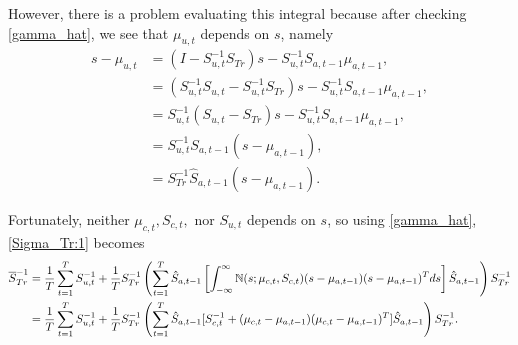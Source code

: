 \documentclass[12pt,leqno]{article}
\begin{document}
However, there is a problem evaluating this integral because after checking \eqref{gamma_hat}, we see that $\mu_{u,t}$
depends on $s$, namely  
\begin{equation}\label{s-mu_1}
  \begin{split}
    s-\mu_{u,t} &= (I - S_{u,t}^{-1}S_{Tr})s - S_{u,t}^{-1}S_{a,t-1}\mu_{a,t-1}, \\
    &= (S_{u,t}^{-1}S_{u,t} - S_{u,t}^{-1}S_{Tr})s - S_{u,t}^{-1}S_{a,t-1}\mu_{a,t-1}, \\
    &= S_{u,t}^{-1}(S_{u,t} - S_{Tr})s - S_{u,t}^{-1}S_{a,t-1}\mu_{a,t-1}, \\
    &= S_{u,t}^{-1}S_{a,t-1}(s - \mu_{a,t-1}),\\
    &= S_{Tr}^{-1}\hat{S}_{a,t-1}(s-\mu_{a,t-1}).
  \end{split}
\end{equation}


Fortunately, neither $\mu_{c,t},S_{c,t},$ nor $S_{u,t}$ depends on $s$,
so using \eqref{gamma_hat}, \eqref{Sigma_Tr:1} becomes
\begin{align}
  \overline{S}_{Tr}^{-1} &=\frac{1}{T}\sum_{t=1}^TS_{u,t}^{-1} +\frac{1}{T}S_{Tr}^{-1}\left(\sum_{t=1}^T\hat{S}_{a,t-1}
  \left[\int_{-\infty}^{\infty}{\mathbb N}(s;\mu_{c,t},S_{c,t})(s-\mu_{a,t-1})(s-\mu_{a,t-1})^Tds\right]\hat{S}_{a,t-1}\right)S_{Tr}^{-1}
  \notag\\
   &=\frac{1}{T}\sum_{t=1}^TS_{u,t}^{-1}+\frac{1}{T}S_{Tr}^{-1}\left(\sum_{t=1}^T\hat{S}_{a,t-1}
   [S_{c,t}^{-1}+(\mu_{c,t}-\mu_{a,t-1})(\mu_{c,t}-\mu_{a,t-1})^T]\hat{S}_{a,t-1}\right)S_{Tr}^{-1}.\label{S_Tr:2}
  \end{align}
\end{document}
